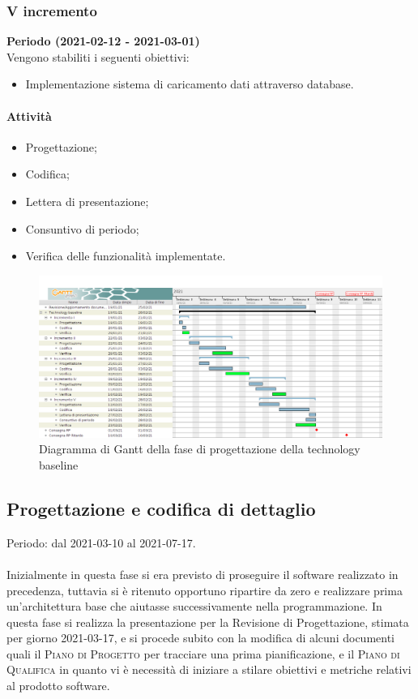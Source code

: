 \documentclass[../piano_di_progetto.tex]{subfiles}
\begin{document}
\subsubsection*{V incremento}
\textbf{Periodo (2021-02-12 - 2021-03-01)} \\
Vengono stabiliti i seguenti obiettivi:
\begin{itemize}
    \item Implementazione sistema di caricamento dati attraverso database.
\end{itemize}
\paragraph*{Attività}
\begin{itemize}
    \item Progettazione;
    \item Codifica;
    \item Lettera di presentazione;
    \item Consuntivo di periodo;
    \item Verifica delle funzionalità implementate.
\end{itemize}


\begin{figure}[H]
    \centering
    \includegraphics[width=18cm]{src/img/gantt/4_3_tech_baseline.png}
    \caption{Diagramma di Gantt della fase di progettazione della technology baseline}
\end{figure}



\subsection{Progettazione e codifica di dettaglio}%
\label{sub:prog_dett}

Periodo: dal 2021-03-10 al 2021-07-17.\\ \\
Inizialmente in questa fase si era previsto di proseguire il software realizzato in precedenza, tuttavia si è ritenuto opportuno ripartire da zero e realizzare prima un'architettura 
base che aiutasse successivamente nella programmazione. 
In questa fase si realizza la presentazione per la Revisione di Progettazione, stimata per giorno 2021-03-17, e si procede subito con la modifica di alcuni documenti quali
il \textsc{Piano di Progetto} per tracciare una prima pianificazione, e il \textsc{Piano di Qualifica} in quanto vi è necessità di iniziare a stilare obiettivi e metriche relativi al prodotto software.
\end{document}
